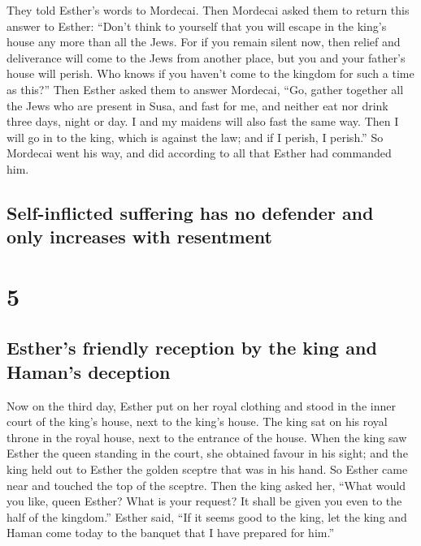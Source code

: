  They told Esther's words to Mordecai. 
Then Mordecai asked them to return this answer to Esther: ``Don't think
to yourself that you will escape in the king's house any more than all
the Jews.  For if you remain silent now, then relief and
deliverance will come to the Jews from another place, but you and your
father's house will perish. Who knows if you haven't come to the kingdom
for such a time as this?''  Then Esther asked them to
answer Mordecai,  ``Go, gather together all the Jews who
are present in Susa, and fast for me, and neither eat nor drink three
days, night or day. I and my maidens will also fast the same way. Then I
will go in to the king, which is against the law; and if I perish, I
perish.''  So Mordecai went his way, and did according to
all that Esther had commanded him.

\hypertarget{self-inflicted-suffering-has-no-defender-and-only-increases-with-resentment}{%
\subsection{Self-inflicted suffering has no defender and only increases
with
resentment}\label{self-inflicted-suffering-has-no-defender-and-only-increases-with-resentment}}

\hypertarget{section-4}{%
\section{5}\label{section-4}}

\hypertarget{esthers-friendly-reception-by-the-king-and-hamans-deception}{%
\subsection{Esther's friendly reception by the king and Haman's
deception}\label{esthers-friendly-reception-by-the-king-and-hamans-deception}}

 Now on the third day, Esther put on her royal clothing
and stood in the inner court of the king's house, next to the king's
house. The king sat on his royal throne in the royal house, next to the
entrance of the house.  When the king saw Esther the queen
standing in the court, she obtained favour in his sight; and the king
held out to Esther the golden sceptre that was in his hand. So Esther
came near and touched the top of the sceptre.  Then the
king asked her, ``What would you like, queen Esther? What is your
request? It shall be given you even to the half of the kingdom.''
 Esther said, ``If it seems good to the king, let the king
and Haman come today to the banquet that I have prepared for him.''

